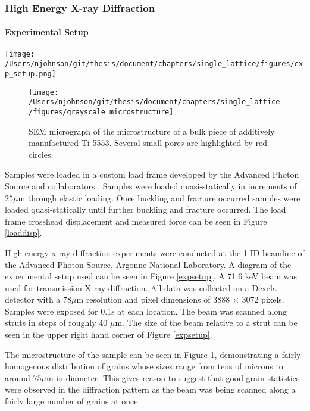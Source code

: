 \subsubsection{High Energy X-ray Diffraction}
\paragraph{Experimental Setup}
\begin{figure*}[t]
	\texttt{[image: /Users/njohnson/git/thesis/document/chapters/single\_lattice/figures/exp\_setup.png]}
	\caption{The orientation of the part in the laboratory coordinate frame relative to the X-ray beam and the detector.}
	\label{expsetup}
\end{figure*}

%
\begin{figure}
	\texttt{[image: /Users/njohnson/git/thesis/document/chapters/single\_lattice/figures/grayscale\_microstructure]}
	\caption{SEM micrograph of the microstructure of a bulk piece of additively manufactured Ti-5553. Several small pores are highlighted by red circles.}
	\label{microstructure}
\end{figure}

Samples were loaded in a custom load frame developed by the Advanced Photon Source and collaborators \cite{Loadframe}. Samples were loaded quasi-statically in increments of $25 \mu$m through elastic loading. Once buckling and fracture occurred samples were loaded quasi-statically until further buckling and fracture occurred. The load frame crosshead displacement and measured force can be seen in Figure \ref{loaddisp}.

High-energy x-ray diffraction experiments were conducted at the 1-ID beamline of the Advanced Photon Source, Argonne National Laboratory. A diagram of the experimental setup used can be seen in Figure \ref{expsetup}. A 71.6 keV beam was used for transmission X-ray diffraction. All data was collected on a Dexela detector with a 78$\mu$m resolution and pixel dimensions of 3888 $\times$ 3072 pixels. Samples were exposed for $0.1$s at each location. The beam was scanned along struts in steps of roughly 40 $\mu$m. The size of the beam relative to a strut can be seen in the upper right hand corner of Figure \ref{expsetup}.%

The microstructure of the sample can be seen in Figure \ref{microstructure}, demonstrating a fairly homogenous distribution of grains whose sizes range from tens of microns to around $75\mu$m in diameter. This gives reason to suggest that good grain statistics were observed in the diffraction pattern as the beam was being scanned along a fairly large number of grains at once.

